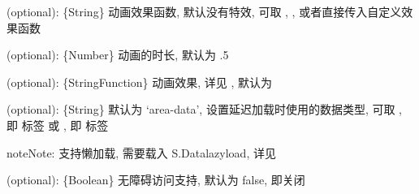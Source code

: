 \documentclass[letterpaper,10pt,english]{sphinxmanual}
\begin{document}
\begin{fulllineitems}
\label{api/component/switchable/switchable:Switchable.effect}
(optional):  \{String\} 动画效果函数, 默认没有特效, 可取 , ,  或者直接传入自定义效果函数

\end{fulllineitems}



\begin{fulllineitems}
\label{api/component/switchable/switchable:Switchable.duration}
(optional):  \{Number\} 动画的时长, 默认为 .5

\end{fulllineitems}



\begin{fulllineitems}
\label{api/component/switchable/switchable:Switchable.easing}
(optional):  \{String\textbar{}Function\} 动画效果, 详见 {\hyperref[api/core/anim/index:Anim.Anim]{}}, 默认为 

\end{fulllineitems}



\begin{fulllineitems}
\label{api/component/switchable/switchable:Switchable.lazyDataType}
(optional):  \{String\} 默认为 `area-data', 设置延迟加载时使用的数据类型, 可取 , 即  标签 或 , 即  标签

\end{fulllineitems}


\begin{notice}{note}{Note:}
支持懒加载, 需要载入 S.Datalazyload, 详见 
\end{notice}


\begin{fulllineitems}
\label{api/component/switchable/switchable:Switchable.aria}
(optional): \{Boolean\} 无障碍访问支持, 默认为 false, 即关闭

\end{fulllineitems}
\end{document}
